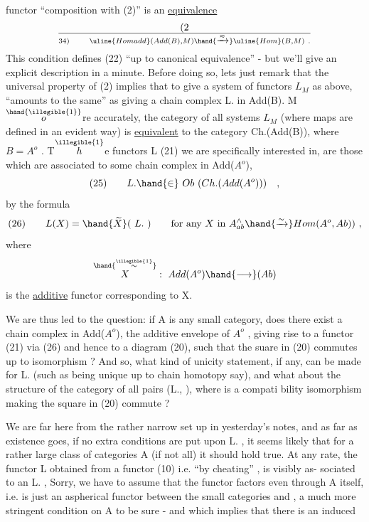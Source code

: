 functor ``composition with (2)'' is an \uline{equivalence}
\[ (2\over{3}{4}) \qquad \uline{Homadd}(Add(B),M) \hand{\xrightarrow{\approx}} \uline{Hom}(B,M) \ . \]
This condition defines (22) ``up to canonical equivalence'' - but we'll
give an explicit description in a minute. Before doing so, lets
just remark that the universal property of (2) implies that to give
a system of functors $L_M$ as above, ``amounts to the same'' as giving a
chain complex L. in Add(B). M$\overset{\hand{\illegible{1}}}{o}$re accurately, the category of all
systems $L_M$ (where maps are defined in an evident way) is \uline{equivalent}
to the category Ch.(Add(B)), where $B=A^o$ . T$\overset{\illegible{1}}{h}$e functors L (21)
we are specifically interested in, are those which are associated to
some chain complex in Add($A^o$),
\[ (25) \qquad L. \hand{\in} \ Ob\ (Ch.(Add(A^o))) \quad , \]
by the formula
\[ (26) \qquad L(X) = \hand{\widetilde{X}}(\ L.\ ) \qquad \text{for any } X \text{ in } A^{\wedge}_{ab} \hand{\xrightarrow{\sim}} Hom(A^o,Ab)) \ , \]
where
\[ \overset{\hand{\overset{\illegible{1}}{\sim}}}{X} : \ Add(A^o) \hand{\longrightarrow} (Ab) \]
is the \uline{additive} functor corresponding to X.

We are thus led to the question: if A is any small category,
does there exist a chain complex  in Add($A^o$), the additive envelope of
$A^o$ , giving rise to a functor (21) via (26) and hence to a diagram
(20), such that the suare in (20) commutes up to isomorphism ? And
  so, what kind of unicity statement, if any, can be made for L.
(such as being unique up to chain homotopy say), and what about the
structure of the category of all pairs (L., \hand{$\lambda$} ), where \hand{$\lambda$} is a compati%
bility isomorphism making the square in (20) commute ?

We are far here from the rather narrow set up in yesterday's
notes, and as far as existence goes, if no extra conditions are put
upon L. , it seems likely that for a rather large class of  categories
A (if not all) it should hold true. At any rate, the functor L
obtained from a  functor (10) i.e. ``by cheating'' , is visibly as-%
sociated to an L. ,  Sorry, we have to assume that the
functor  factors even through A itself, i.e. is just an aspherical
functor between the small categories \hand{$\Delta$} and  , a much more stringent
condition on A to be sure - and which implies that there is an induced


